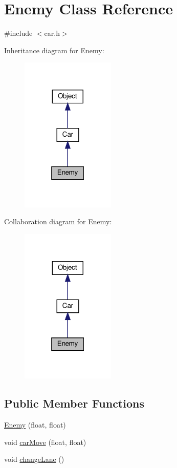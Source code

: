 \hypertarget{classEnemy}{}\section{Enemy Class Reference}
\label{classEnemy}


{\ttfamily \#include $<$car.\+h$>$}



Inheritance diagram for Enemy\+:\nopagebreak
\begin{figure}[H]
\begin{center}
\leavevmode
\includegraphics[width=127pt]{classEnemy__inherit__graph}
\end{center}
\end{figure}


Collaboration diagram for Enemy\+:\nopagebreak
\begin{figure}[H]
\begin{center}
\leavevmode
\includegraphics[width=127pt]{classEnemy__coll__graph}
\end{center}
\end{figure}
\subsection*{Public Member Functions}
\begin{DoxyCompactItemize}
\item 
\hyperlink{classEnemy_a3aca7827da68a391100d2bc1a4873625}{Enemy} (float, float)
\item 
void \hyperlink{classEnemy_a8b36ae5a6d6fd18d0064139ce92e7661}{car\+Move} (float, float)
\item 
void \hyperlink{classEnemy_a58402ae6b3e519ecad7d1c61961a4904}{change\+Lane} ()
\end{DoxyCompactItemize}
